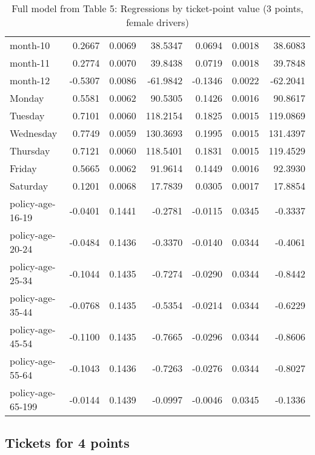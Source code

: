 \documentclass[10pt]{article}
\begin{document}
\begin{table}[ht]
\begin{tabular}{lrrrrrr}
  month-10 & 0.2667 & 0.0069 & 38.5347 & 0.0694 & 0.0018 & 38.6083 \\ 
  month-11 & 0.2774 & 0.0070 & 39.8438 & 0.0719 & 0.0018 & 39.7848 \\ 
  month-12 & -0.5307 & 0.0086 & -61.9842 & -0.1346 & 0.0022 & -62.2041 \\ 
  Monday & 0.5581 & 0.0062 & 90.5305 & 0.1426 & 0.0016 & 90.8617 \\ 
  Tuesday & 0.7101 & 0.0060 & 118.2154 & 0.1825 & 0.0015 & 119.0869 \\ 
  Wednesday & 0.7749 & 0.0059 & 130.3693 & 0.1995 & 0.0015 & 131.4397 \\ 
  Thursday & 0.7121 & 0.0060 & 118.5401 & 0.1831 & 0.0015 & 119.4529 \\ 
  Friday & 0.5665 & 0.0062 & 91.9614 & 0.1449 & 0.0016 & 92.3930 \\ 
  Saturday & 0.1201 & 0.0068 & 17.7839 & 0.0305 & 0.0017 & 17.8854 \\ 
  policy-age-16-19 & -0.0401 & 0.1441 & -0.2781 & -0.0115 & 0.0345 & -0.3337 \\ 
  policy-age-20-24 & -0.0484 & 0.1436 & -0.3370 & -0.0140 & 0.0344 & -0.4061 \\ 
  policy-age-25-34 & -0.1044 & 0.1435 & -0.7274 & -0.0290 & 0.0344 & -0.8442 \\ 
  policy-age-35-44 & -0.0768 & 0.1435 & -0.5354 & -0.0214 & 0.0344 & -0.6229 \\ 
  policy-age-45-54 & -0.1100 & 0.1435 & -0.7665 & -0.0296 & 0.0344 & -0.8606 \\ 
  policy-age-55-64 & -0.1043 & 0.1436 & -0.7263 & -0.0276 & 0.0344 & -0.8027 \\ 
  policy-age-65-199 & -0.0144 & 0.1439 & -0.0997 & -0.0046 & 0.0345 & -0.1336 \\ 
   \hline
\end{tabular}
\caption{Full model from Table 5: Regressions by ticket-point value (3 points, female drivers)} 
\label{tab_5_3_pts_F}
\end{table}


\clearpage
\pagebreak




\subsection{Tickets for 4 points}
\end{document}
